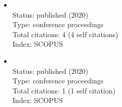 \begin{refsection}
\begin{itemize}
		\item{}\vspace{2mm}\\Status: published (2020)\\Type: conference proceedings\\Total citations: 4 (4 self citations)\\Index: SCOPUS
		\item{}\vspace{2mm}\\Status: published (2020)\\Type: conference proceedings\\Total citations: 1 (1 self citation)\\Index: SCOPUS
\end{itemize}
\end{refsection}
